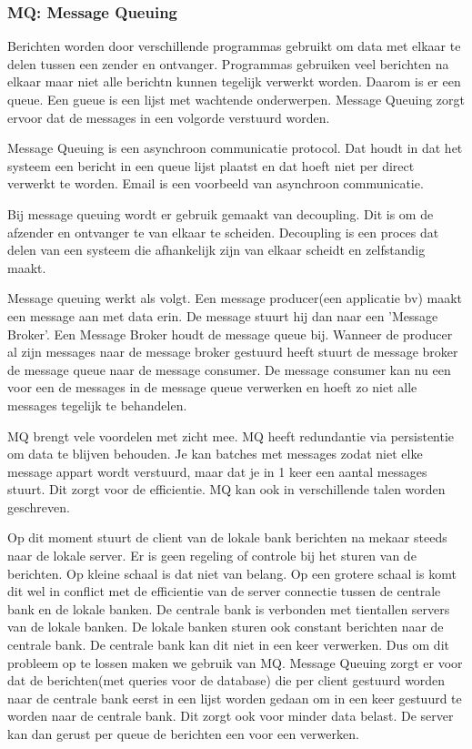 \documentclass{article}
\begin{document}
\subsubsection{MQ: Message Queuing}
Berichten worden door verschillende programmas gebruikt
om data met elkaar te delen tussen een zender en ontvanger.
Programmas gebruiken veel berichten na elkaar maar niet
alle berichtn kunnen tegelijk verwerkt worden.
Daarom is er een queue. Een gueue is een lijst met wachtende onderwerpen.
Message Queuing zorgt ervoor dat de messages in een volgorde verstuurd worden.

Message Queuing is een asynchroon communicatie protocol.
Dat houdt in dat het systeem een bericht in een queue lijst plaatst
en dat hoeft niet per direct verwerkt te worden.
Email is een voorbeeld van asynchroon communicatie.

Bij message queuing wordt er gebruik gemaakt van decoupling.
Dit is om de afzender en ontvanger te van elkaar te scheiden.
Decoupling is een proces dat delen van een systeem die afhankelijk
zijn van elkaar scheidt en zelfstandig maakt.

Message queuing werkt als volgt.
Een message producer(een applicatie bv) maakt een message aan met data erin.
De message stuurt hij dan naar een 'Message Broker'.
Een Message Broker houdt de message queue bij.
Wanneer de producer al zijn messages naar de message broker
gestuurd heeft stuurt de message broker de message queue naar
de message consumer.
De message consumer kan nu een voor een de messages in de message queue
verwerken en hoeft zo niet alle messages tegelijk te behandelen.

MQ brengt vele voordelen met zicht mee.
MQ heeft redundantie via persistentie om data te blijven behouden.
Je kan batches met messages zodat niet elke message appart wordt
verstuurd, maar dat je in 1 keer een aantal messages stuurt.
Dit zorgt voor de efficientie.
MQ kan ook in verschillende talen worden geschreven.



Op dit moment stuurt de client van de lokale bank berichten na mekaar steeds naar de lokale server.
Er is geen regeling of controle bij het sturen van de berichten.
Op kleine schaal is dat niet van belang.
Op een grotere schaal is komt dit wel in conflict met de efficientie van
de server connectie tussen de centrale bank en de lokale banken.
De centrale bank is verbonden met tientallen servers van de lokale banken.
De lokale banken sturen ook constant berichten naar de centrale bank.
De centrale bank kan dit niet in een keer verwerken.
Dus om dit probleem op te lossen maken we gebruik van MQ.
Message Queuing zorgt er voor dat de berichten(met queries voor de database)
die per client gestuurd worden naar de centrale bank eerst in een lijst worden gedaan
om in een keer gestuurd te worden naar de centrale bank.
Dit zorgt ook voor minder data belast.
De server kan dan gerust per queue de berichten een voor een verwerken.
\end{document}
